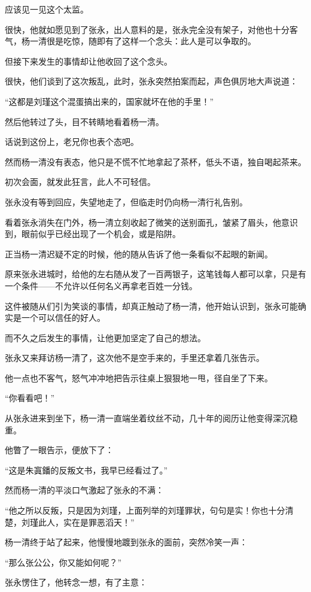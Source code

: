 \begin{multicols}{\theparacolNo}
应该见一见这个太监。

很快，他就如愿见到了张永，出人意料的是，张永完全没有架子，对他也十分客气，杨一清很是吃惊，随即有了这样一个念头：此人是可以争取的。

但接下来发生的事情却让他收回了这个念头。

很快，他们谈到了这次叛乱，此时，张永突然拍案而起，声色俱厉地大声说道：

“这都是刘瑾这个混蛋搞出来的，国家就坏在他的手里！”

然后他转过了头，目不转睛地看着杨一清。

话说到这份上，老兄你也表个态吧。

然而杨一清没有表态，他只是不慌不忙地拿起了茶杯，低头不语，独自喝起茶来。

初次会面，就发此狂言，此人不可轻信。

张永没有等到回应，失望地走了，但临走时仍向杨一清行礼告别。

看着张永消失在门外，杨一清立刻收起了微笑的送别面孔，皱紧了眉头，他意识到，眼前似乎已经出现了一个机会，或是陷阱。

正当杨一清迟疑不定的时候，他的随从告诉了他一条看似不起眼的新闻。

原来张永进城时，给他的左右随从发了一百两银子，这笔钱每人都可以拿，只是有一个条件——不允许以任何名义再拿老百姓一分钱。

这件被随从们引为笑谈的事情，却真正触动了杨一清，他开始认识到，张永可能确实是一个可以信任的好人。

而不久之后发生的事情，让他更加坚定了自己的想法。

张永又来拜访杨一清了，这次他不是空手来的，手里还拿着几张告示。

他一点也不客气，怒气冲冲地把告示往桌上狠狠地一甩，径自坐了下来。

“你看看吧！”

从张永进来到坐下，杨一清一直端坐着纹丝不动，几十年的阅历让他变得深沉稳重。

他瞥了一眼告示，便放下了：

“这是朱寘鐇的反叛文书，我早已经看过了。”

然而杨一清的平淡口气激起了张永的不满：

“他之所以反叛，只是因为刘瑾，上面列举的刘瑾罪状，句句是实！你也十分清楚，刘瑾此人，实在是罪恶滔天！”

杨一清终于站了起来，他慢慢地踱到张永的面前，突然冷笑一声：

“那么张公公，你又能如何呢？”

张永愣住了，他转念一想，有了主意：


\end{multicols}
